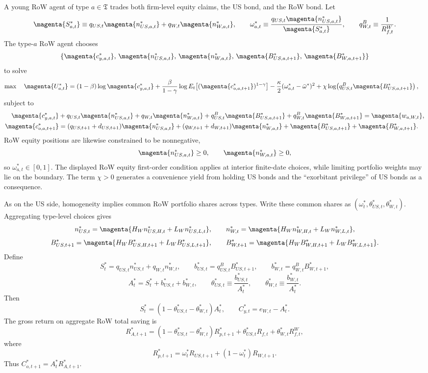 \documentclass{article}
\begin{document}
A young RoW agent of type $a\in\mathfrak T$ trades both firm-level equity claims, the US bond, and the RoW bond. Let
\[
\magenta{S_{a,t}^{*}}\equiv q_{US,t}\magenta{n^{*}_{US,a,t}}+q_{W,t}\magenta{n^{*}_{W,a,t}},
\qquad
\omega^*_{a,t}\equiv\frac{q_{US,t}\magenta{n^{*}_{US,a,t}}}{\magenta{S^{*}_{a,t}}},
\qquad
q^B_{W,t}\equiv\frac{1}{R_{f,t}^W}.
\]
The type-$a$ RoW agent chooses
\[
\{\magenta{c^*_{y,a,t}},\,\magenta{n^*_{US,a,t}},\,\magenta{n^*_{W,a,t}},\,\magenta{B^*_{US,a,t+1}},\,\magenta{B^*_{W,a,t+1}}\}
\]
to solve
\begin{align*}
\max\quad \magenta{U_{a,t}^*}
&=
(1-\beta)\log \magenta{c^*_{y,a,t}}
+\frac{\beta}{1-\gamma}\log E_t\!\left[(\magenta{c^*_{o,a,t+1}})^{1-\gamma}\right]
-\frac{\kappa}{2}(\omega^*_{a,t}-\bar\omega^*)^2
+\chi\log\!\left(q^B_{US,t}\magenta{B^*_{US,a,t+1}}\right),
\end{align*}
subject to
\begin{align*}
\magenta{c^*_{y,a,t}}
&+q_{US,t}\magenta{n^*_{US,a,t}}+q_{W,t}\magenta{n^*_{W,a,t}}
+q^B_{US,t}\magenta{B^*_{US,a,t+1}}+q^B_{W,t}\magenta{B^*_{W,a,t+1}}
= \magenta{w_{a,W,t}},\\
\magenta{c^*_{o,a,t+1}}
&=
(q_{US,t+1}+d_{US,t+1})\magenta{n^*_{US,a,t}}
+(q_{W,t+1}+d_{W,t+1})\magenta{n^*_{W,a,t}}
+\magenta{B^*_{US,a,t+1}}+\magenta{B^*_{W,a,t+1}}.
\end{align*}
RoW equity positions are likewise constrained to be nonnegative,
\[
\magenta{n^*_{US,a,t}}\ge0,
\qquad
\magenta{n^*_{W,a,t}}\ge0,
\]
so $\omega^*_{a,t}\in[0,1]$.  The displayed RoW equity first-order condition applies at interior finite-date choices, while limiting portfolio weights may lie on the boundary.
The term $\chi>0$ generates a convenience yield from holding US bonds and the ``exorbitant privilege'' of US bonds as a consequence.

As on the US side, homogeneity implies common RoW portfolio shares across types. Write these common shares as $(\omega_t^*,\theta_{US,t}^*,\theta_{W,t}^*)$. Aggregating type-level choices gives
\[
n^*_{US,t}=\magenta{H_Wn^*_{US,H,t}+L_Wn^*_{US,L,t}},
\qquad
n^*_{W,t}=\magenta{H_Wn^*_{W,H,t}+L_Wn^*_{W,L,t}},
\]
\[
B^*_{US,t+1}=\magenta{H_WB^*_{US,H,t+1}+L_WB^*_{US,L,t+1}},
\qquad
B^*_{W,t+1}=\magenta{H_WB^*_{W,H,t+1}+L_WB^*_{W,L,t+1}}.
\]
Define
\[
S_t^*=q_{US,t}n^*_{US,t}+q_{W,t}n^*_{W,t},
\qquad
b_{US,t}^*=q^B_{US,t}B^*_{US,t+1},
\qquad
b_{W,t}^*=q^B_{W,t}B^*_{W,t+1},
\]
\[
A_t^*=S_t^*+b_{US,t}^*+b_{W,t}^*,
\qquad
\theta_{US,t}^*\equiv\frac{b_{US,t}^*}{A_t^*},
\qquad
\theta_{W,t}^*\equiv\frac{b_{W,t}^*}{A_t^*}.
\]
Then
\[
S_t^*=(1-\theta_{US,t}^*-\theta_{W,t}^*)A_t^*,
\qquad
C^*_{y,t}=e_{W,t}-A_t^*.
\]
The gross return on aggregate RoW total saving is
\[
R_{A,t+1}^*
=
(1-\theta_{US,t}^*-\theta_{W,t}^*)R_{p,t+1}^*
+\theta_{US,t}^*R_{f,t}
+\theta_{W,t}^*R_{f,t}^W,
\]
where
\[
R_{p,t+1}^*=\omega_t^*R_{US,t+1}+(1-\omega_t^*)R_{W,t+1}.
\]
Thus $C^*_{o,t+1}=A_t^*R_{A,t+1}^*$.
\end{document}
